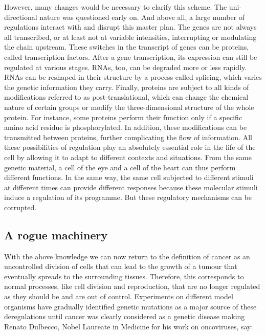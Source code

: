 \documentclass[a4paper,12pt,twoside,onecolumn,openright,final,oldfontcommands]{memoir}
\begin{document}
However, many changes would be necessary to clarify this scheme. The
uni-directional nature was questioned early on. And above all, a large
number of regulations interact with and disrupt this master plan. The
genes are not always all transcribed, or at least not at variable
intensities, interrupting or modulating the chain upstream. These
switches in the transcript of genes can be proteins, called
transcription factors. After a gene transcription, its expression can
still be regulated at various stages. RNAs, too, can be degraded more or
less rapidly. RNAs can be reshaped in their structure by a process
called splicing, which varies the genetic information they carry.
Finally, proteins are subject to all kinds of modifications referred to
as post-translational, which can change the chemical nature of certain
groups or modify the three-dimensional structure of the whole protein.
For instance, some proteins perform their function only if a specific
amino acid residue is phosphorylated. In addition, these modifications
can be transmitted between proteins, further complicating the flow of
information. All these possibilities of regulation play an absolutely
essential role in the life of the cell by allowing it to adapt to
different contexts and situations. From the same genetic material, a
cell of the eye and a cell of the heart can thus perform different
functions. In the same way, the same cell subjected to different stimuli
at different times can provide different responses because these
molecular stimuli induce a regulation of its programme. But these
regulatory mechanisms can be corrupted.

\subsection{A rogue machinery}\label{a-rogue-machinery}

With the above knowledge we can now return to the definition of cancer
as an uncontrolled division of cells that can lead to the growth of a
tumour that eventually spreads to the surrounding tissues. Therefore,
this corresponds to normal processes, like cell division and
reproduction, that are no longer regulated as they should be and are out
of control. Experiments on different model organisms have gradually
identified genetic mutations as a major source of these deregulations
\citep[\citet{reddy1982point}]{nowell1976clonal} until cancer was
clearly considered as a genetic disease making Renato Dulbecco, Nobel
Laureate in Medicine for his work on oncoviruses, say:
\end{document}
